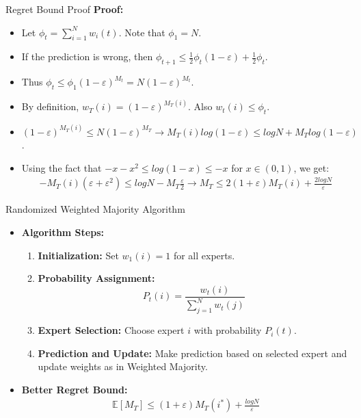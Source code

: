 \documentclass{beamer}
\begin{document}
\begin{frame}{Regret Bound Proof}
    \textbf{Proof:}
    \begin{itemize}
        \item Let $\phi_t = \sum_{i=1}^{N} w_i(t)$. Note that $\phi_{1} = N$.
        \item If the prediction is wrong, then $\phi_{t+1} \leq \frac{1}{2} \phi_t(1-\varepsilon) + \frac{1}{2} \phi_t$.
        \item Thus $\phi_{t} \leq \phi_1 (1-\varepsilon)^{M_t} = N(1-\varepsilon)^{M_t}$.
        \item By definition, $w_T(i) = (1-\varepsilon)^{M_T(i)}$. Also $w_t(i) \leq \phi_t$.
        \item $(1-\varepsilon)^{M_T(i)} \leq N(1-\varepsilon)^{M_T} \rightarrow M_T(i) log(1-\varepsilon) \leq log N + M_T log(1-\varepsilon)$.
        \item Using the fact that $-x-x^2 \leq log(1-x) \leq -x$ for $x \in (0,1)$, we get:
        \begin{align*}
            -M_T(i) (\varepsilon + \varepsilon^2) \leq log N - M_T \frac{\varepsilon}{2} \rightarrow M_T \leq 2(1+\varepsilon)M_T(i) + \frac{2log N}{\varepsilon}
        \end{align*}
    \end{itemize}
\end{frame}


\begin{frame}{Randomized Weighted Majority Algorithm}
    \begin{itemize}
        \item \textbf{Algorithm Steps:}
            \begin{enumerate}
                \item \textbf{Initialization:} Set $w_1(i) = 1$ for all experts.
                \item \textbf{Probability Assignment:}
                \[
                    P_t(i) = \frac{w_t(i)}{\sum_{j=1}^{N} w_t(j)}
                \]
                \item \textbf{Expert Selection:} Choose expert $i$ with probability $P_i(t)$.
                \item \textbf{Prediction and Update:} Make prediction based on selected expert and update weights as in Weighted Majority.
            \end{enumerate}
        \item \textbf{Better Regret Bound:} \\
        \begin{align*}
            \mathbb{E}[M_T] \leq (1+\varepsilon)M_T(i^*) + \frac{log N}{\varepsilon}
        \end{align*}
    \end{itemize}
\end{frame}
\end{document}
